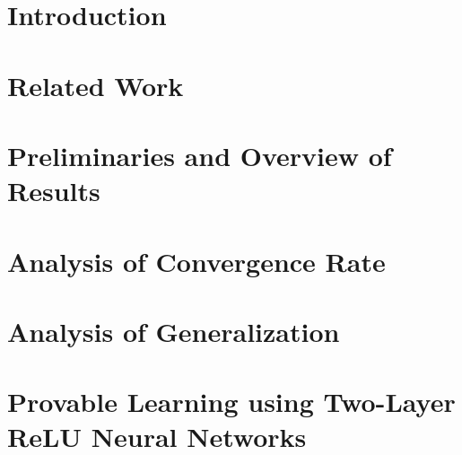 \documentclass{article}
\begin{document}
\begin{abstract}
	
\end{abstract}

\section{Introduction}
\label{sec:intro}


\section{Related Work}
\label{sec:rel}



\section{Preliminaries and Overview of Results}
\label{sec:pre}



%

\section{Analysis of Convergence Rate}
\label{sec:rate}


\section{Analysis of Generalization}
\label{sec:generalization}


\section{Provable Learning using Two-Layer ReLU Neural Networks}
\label{sec:improper}


%
\end{document}
